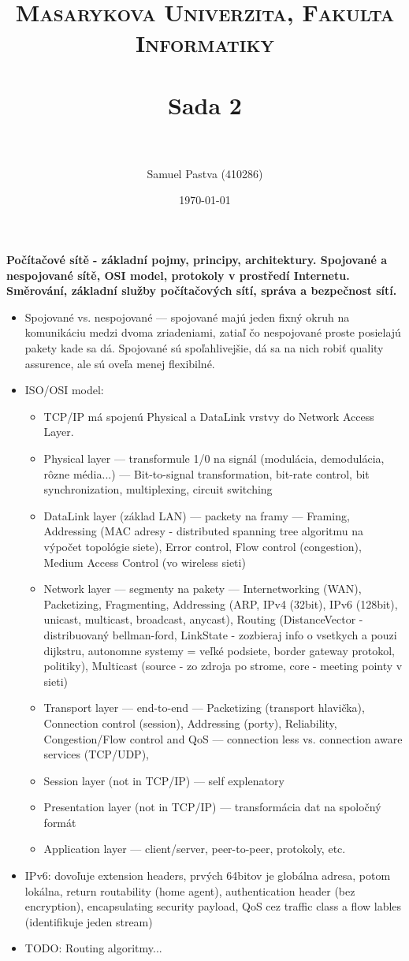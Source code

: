 \documentclass[paper=a4, fontsize=11pt]{scrartcl} %
\title{	
	\normalfont \normalsize 
	\textsc{Masarykova Univerzita, Fakulta Informatiky} \\ [25pt] %
	\horrule{0.5pt} \\[0.4cm] %
	\huge Sada 2 \\ %
	\horrule{2pt} \\[0.5cm] %
}
\author{Samuel Pastva (410286)} %
\date{\normalsize\today} %
\numberwithin{equation}{section} %
\numberwithin{figure}{section} %
\numberwithin{table}{section} %
\begin{document}
	
	\textbf{Počítačové sítě - základní pojmy, principy, architektury. Spojované a nespojované sítě, OSI model, protokoly v prostředí Internetu. Směrování, základní služby počítačových sítí, správa a bezpečnost sítí.}
	
	\begin{itemize}
		\item Spojované vs. nespojované — spojované majú jeden fixný okruh na komunikáciu medzi dvoma zriadeniami, zatiaľ čo nespojované proste posielajú pakety kade sa dá. Spojované sú spoľahlivejšie, dá sa na nich robiť quality assurence, ale sú oveľa menej flexibilné.
		
		\item ISO/OSI model:
		
		\begin{itemize}
			\item TCP/IP má spojenú Physical a DataLink vrstvy do Network Access Layer.
			\item Physical layer — transformule 1/0 na signál (modulácia, demodulácia, rôzne média...) — Bit-to-signal transformation, bit-rate control, bit synchronization, multiplexing, circuit switching
			\item DataLink layer (základ LAN) — packety na framy — Framing, Addressing (MAC adresy - distributed spanning tree algoritmu na výpočet topológie siete), Error control, Flow control (congestion), Medium Access Control (vo wireless sieti)
			\item Network layer — segmenty na pakety — Internetworking (WAN), Packetizing, Fragmenting, Addressing (ARP, IPv4 (32bit), IPv6 (128bit), unicast, multicast, broadcast, anycast), Routing (DistanceVector - distribuovaný bellman-ford, LinkState - zozbieraj info o vsetkych a pouzi dijkstru, autonomne systemy = veľké podsiete, border gateway protokol, politiky), Multicast (source - zo zdroja po strome, core - meeting pointy v sieti)
			\item Transport layer — end-to-end — Packetizing (transport hlavička), Connection control (session), Addressing (porty), Reliability, Congestion/Flow control and QoS — connection less vs. connection aware services (TCP/UDP), 
			\item Session layer (not in TCP/IP) — self explenatory
			\item Presentation layer (not in TCP/IP) — transformácia dat na spoločný formát
			\item Application layer — client/server, peer-to-peer, protokoly, etc.
		\end{itemize}
	
		\item IPv6: dovoľuje extension headers, prvých 64bitov je globálna adresa, potom lokálna, return routability (home agent), authentication header (bez encryption), encapsulating security payload, QoS cez traffic class a flow lables (identifikuje jeden stream) 
		
		\item TODO: Routing algoritmy...
	\end{itemize}
	
\end{document}
